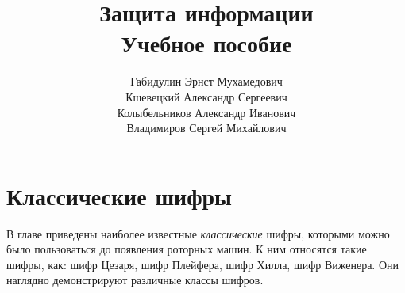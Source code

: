 \documentclass[10pt,a4paper,openany]{book}
\begin{document}



\title{Защита информации \\ Учебное пособие}
\author{Габидулин Эрнст Мухамедович \\ Кшевецкий Александр Сергеевич \\ Колыбельников Александр Иванович \\ Владимиров Сергей Михайлович}
\date{
}
\maketitle
\setcounter{page}{3}

\newpage
\setcounter{tocdepth}{2}
\tableofcontents
\newpage








\chapter{Классические шифры}

В главе приведены наиболее известные \emph{классические} шифры, которыми можно было пользоваться до появления роторных машин. К ним относятся такие шифры, как: шифр Цезаря, шифр Плейфера, шифр Хилла, шифр Виженера. Они наглядно демонстрируют различные классы шифров.







%
\end{document}
